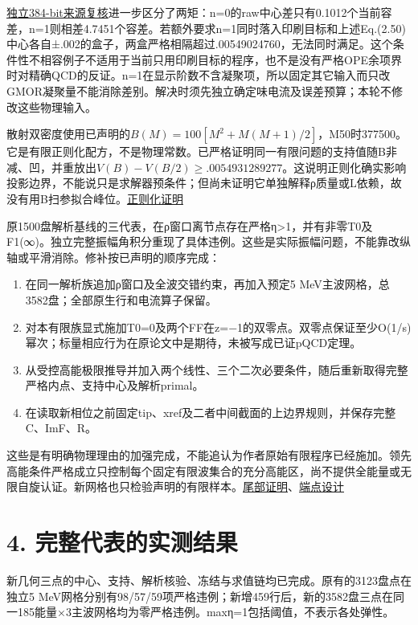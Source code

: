 \documentclass[
  10pt,
  a4paper,
]{article}
\providecommand{\tightlist}{%
  \setlength{\itemsep}{0pt}\setlength{\parskip}{0pt}}
\begin{document}
\href{../MAINLINE_SOURCE_REVIEW.md}{独立384-bit来源复核}进一步区分了两矩：n=0的raw中心差只有0.1012个当前容差，n=1则相差4.7451个容差。若额外要求n=1同时落入印刷目标和上述Eq.(2.50)中心各自±.002的盒子，两盒严格相隔超过.00549024760，无法同时满足。这个条件性不相容例子不适用于当前只用印刷目标的程序，也不是没有严格OPE余项界时对精确QCD的反证。n=1在显示阶数不含凝聚项，所以固定其它输入而只改GMOR凝聚量不能消除差别。解决时须先独立确定味电流及误差预算；本轮不修改这些物理输入。

散射双密度使用已声明的\(B(M)=100[M^2+M(M+1)/2]\)，M50时377500。它是有限正则化配方，不是物理常数。已严格证明同一有限问题的支持值随B非减、凹，并重放出\(V(B)-V(B/2)\ge.0054931289277\)。这说明正则化确实影响投影边界，不能说只是求解器预条件；但尚未证明它单独解释ρ质量或L依赖，故没有用B扫参拟合峰位。\href{../../../evidence/REGULARIZATION_VALUE_PROOF_20260911.md}{正则化证明}

原1500盘解析基线的三代表，在ρ窗口离节点存在严格η\textgreater1，并有非零T0及F1(∞)。独立完整振幅角积分重现了具体违例。这些是实际振幅问题，不能靠改纵轴或平滑消除。修补按已声明的顺序完成：

\begin{enumerate}
\def\labelenumi{\arabic{enumi}.}
\tightlist
\item
  在同一解析族追加ρ窗口及全波交错约束，再加入预定5
  MeV主波网格，总3582盘；全部原生行和电流算子保留。
\item
  对本有限族显式施加T0=0及两个FF在z=−1的双零点。双零点保证至少O(1/s)幂次；标量相应行为在原论文中是期待，未被写成已证pQCD定理。
\item
  从受控高能极限推导并加入两个线性、三个二次必要条件，随后重新取得完整严格内点、支持中心及解析primal。
\item
  在读取新相位之前固定tip、xref及二者中间截面的上边界规则，并保存完整C、ImF、R。
\end{enumerate}

这些是有明确物理理由的加强完成，不能追认为作者原始有限程序已经施加。领先高能条件严格成立只控制每个固定有限波集合的充分高能区，尚不提供全能量或无限自旋认证。新网格也只检验声明的有限样本。\href{../../../evidence/ANALYTIC_TAIL_UNITARITY_20260911.md}{尾部证明}、\href{../ENDPOINT_DESIGN_ZH.md}{端点设计}

\section{4.
完整代表的实测结果}\label{ux5b8cux6574ux4ee3ux8868ux7684ux5b9eux6d4bux7ed3ux679c}

新几何三点的中心、支持、解析核验、冻结与求值链均已完成。原有的3123盘点在独立5
MeV网格分别有98/57/59项严格违例；新增459行后，新的3582盘三点在同一185能量×3主波网格均为零严格违例。maxη=1包括阈值，不表示各处弹性。
\end{document}

